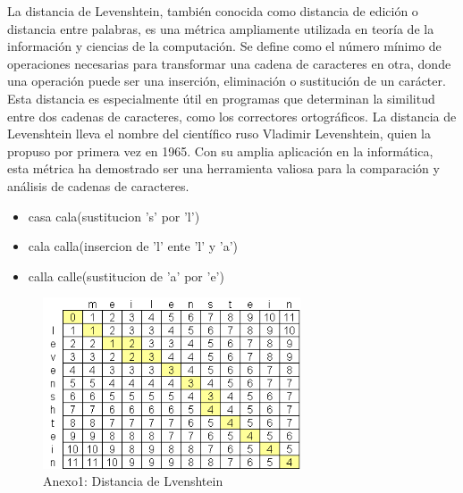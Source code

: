 \documentclass{beamer}
\begin{document}
\begin{frame}
	\begin{minipage}{10 cm}
La distancia de Levenshtein, también conocida como distancia de edición o distancia entre palabras, es una métrica ampliamente utilizada en teoría de la información y ciencias de la computación. Se define como el número mínimo de operaciones necesarias para transformar una cadena de caracteres en otra, donde una operación puede ser una inserción, eliminación o sustitución de un carácter. Esta distancia es especialmente útil en programas que determinan la similitud entre dos cadenas de caracteres, como los correctores ortográficos. La distancia de Levenshtein lleva el nombre del científico ruso Vladimir Levenshtein, quien la propuso por primera vez en 1965. Con su amplia aplicación en la informática, esta métrica ha demostrado ser una herramienta valiosa para la comparación y análisis de cadenas de caracteres.
		\begin{itemize}
			\item casa cala(sustitucion 's' por 'l')
			\item cala calla(insercion de 'l' ente 'l' y 'a')
                   \item  calla calle(sustitucion de 'a' por 'e')
		\end{itemize}
	\end{minipage}
\end{frame}

\begin{figure}[h]
    \centering
	\includegraphics[width=0.68\textwidth]{anexo1.png}
    \caption{Anexo1: Distancia de Lvenshtein}
    \label{img:3}
\end{figure}
\end{document}
